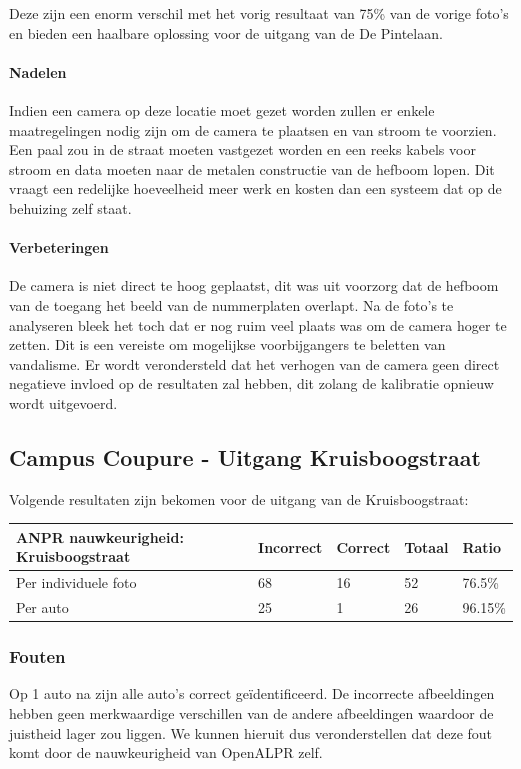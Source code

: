 Deze zijn een enorm verschil met het vorig resultaat van 75\% van de vorige foto's en bieden een haalbare oplossing voor de uitgang van de De Pintelaan.

\paragraph{Nadelen}
Indien een camera op deze locatie moet gezet worden zullen er enkele maatregelingen nodig zijn om de camera te plaatsen en van stroom te voorzien. Een paal zou in de straat moeten vastgezet worden en een reeks kabels voor stroom en data moeten naar de metalen constructie van de hefboom lopen. Dit vraagt een redelijke hoeveelheid meer werk en kosten dan een systeem dat op de behuizing zelf staat.

\paragraph{Verbeteringen}
De camera is niet direct te hoog geplaatst, dit was uit voorzorg dat de hefboom van de toegang het beeld van de nummerplaten overlapt. Na de foto's te analyseren bleek het toch dat er nog ruim veel plaats was om de camera hoger te zetten. Dit is een vereiste om mogelijkse voorbijgangers te beletten van vandalisme. Er wordt verondersteld dat het verhogen van de camera geen direct negatieve invloed op de resultaten zal hebben, dit zolang de kalibratie opnieuw wordt uitgevoerd.

\subsection{Campus Coupure - Uitgang Kruisboogstraat}

Volgende resultaten zijn bekomen voor de uitgang van de Kruisboogstraat:

\begin{table}[h!]
	\centering
	\begin{tabular}{l|l|l|l|l}
		\textbf{ANPR nauwkeurigheid: Kruisboogstraat} & Incorrect & Correct & Totaal & Ratio	\\ \hline
		Per individuele foto 	& 68 & 16	& 52	& 76.5\%\\
		Per auto				& 25 & 1	& 26 	& 96.15\%\\
	\end{tabular}
	\label{ResultatenKruisboog}
\end{table}

\subsubsection{Fouten}
Op 1 auto na zijn alle auto's correct geïdentificeerd. De incorrecte afbeeldingen hebben geen merkwaardige verschillen van de andere afbeeldingen waardoor de juistheid lager zou liggen. We kunnen hieruit dus veronderstellen dat deze fout komt door de nauwkeurigheid van OpenALPR zelf.

